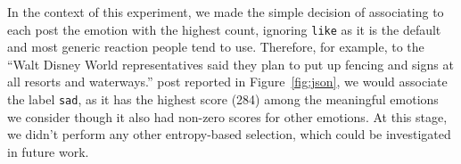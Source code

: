 \documentclass[11pt]{article}
\begin{document}
In the context of this experiment, we made the simple decision of associating to each post the emotion with the highest count, ignoring \texttt{like} as it is the default and most generic reaction people tend to use. Therefore, for example, to the ``Walt Disney World representatives said 
  they plan to put up fencing and signs at all resorts 
  and waterways.'' post reported in Figure~\ref{fig:json}, 
  we would associate the label \texttt{sad}, as it has the highest score (284) among the meaningful emotions we consider though it also had non-zero scores for other emotions. At this stage, we didn't perform any other entropy-based selection, which could be investigated in future work.






%        
\end{document}
